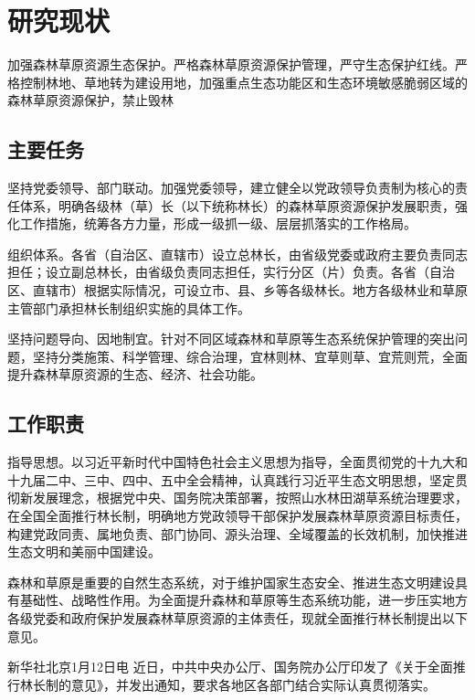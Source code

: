 \section{研究现状}

加强森林草原资源生态保护。严格森林草原资源保护管理，严守生态保护红线。严格控制林地、草地转为建设用地，加强重点生态功能区和生态环境敏感脆弱区域的森林草原资源保护，禁止毁林

\subsection{主要任务}

坚持党委领导、部门联动。加强党委领导，建立健全以党政领导负责制为核心的责任体系，明确各级林（草）长（以下统称林长）的森林草原资源保护发展职责，强化工作措施，统筹各方力量，形成一级抓一级、层层抓落实的工作格局\cite{chen2020table}。

组织体系。各省（自治区、直辖市）设立总林长，由省级党委或政府主要负责同志担任；设立副总林长，由省级负责同志担任，实行分区（片）负责。各省（自治区、直辖市）根据实际情况，可设立市、县、乡等各级林长。地方各级林业和草原主管部门承担林长制组织实施的具体工作。

坚持问题导向、因地制宜。针对不同区域森林和草原等生态系统保护管理的突出问题，坚持分类施策、科学管理、综合治理，宜林则林、宜草则草、宜荒则荒，全面提升森林草原资源的生态、经济、社会功能。

\subsection{工作职责}

指导思想。以习近平新时代中国特色社会主义思想为指导，全面贯彻党的十九大和十九届二中、三中、四中、五中全会精神，认真践行习近平生态文明思想，坚定贯彻新发展理念，根据党中央、国务院决策部署，按照山水林田湖草系统治理要求\cite{Efthymiou2017Matching}，在全国全面推行林长制，明确地方党政领导干部保护发展森林草原资源目标责任，构建党政同责、属地负责、部门协同、源头治理、全域覆盖的长效机制，加快推进生态文明和美丽中国建设。

森林和草原是重要的自然生态系统\cite{luo2018cross}，对于维护国家生态安全、推进生态文明建设具有基础性、战略性作用。为全面提升森林和草原等生态系统功能，进一步压实地方各级党委和政府保护发展森林草原资源的主体责任，现就全面推行林长制提出以下意见。

新华社北京1月12日电 近日，中共中央办公厅、国务院办公厅印发了《关于全面推行林长制的意见》，并发出通知，要求各地区各部门结合实际认真贯彻落实\cite{Deng2019Table2Vec}。


